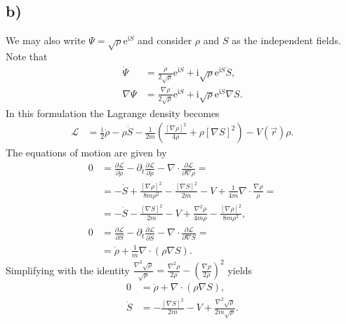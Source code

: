 \documentclass[english, parskip=full]{scrartcl}
\newcommand{\kla}{}
\renewcommand{\i}{\text{i}}
\newcommand{\e}{\text{e}}
\begin{document}
\subsection*{b)}
We may also write $\Psi = \sqrt{\rho}\e^{\i S}$ and consider $\rho$ and $S$ as the independent fields.
Note that
\begin{align}
\dot{\Psi} &= \frac{\dot{\rho}}{2\sqrt{\rho}} \e^{\i S} + \i\sqrt{\rho} \e^{\i S} \dot{S},\\
\nabla\Psi &= \frac{\nabla\rho}{2\sqrt{\rho}} \e^{\i S} + \i\sqrt{\rho}\e^{\i S}\nabla S.
\end{align}
In this formulation the Lagrange density becomes
\begin{align}
\mathcal{L} &= \frac{\i}{2}\dot{\rho} - \rho\dot{S} - \frac{1}{2m}\kla\left( {\frac{[\nabla\rho]^2}{4\rho} + \rho [\nabla S]^2 } \right) - V(\vec{r})\rho.
\end{align}
The equations of motion are given by
\begin{align}
0 &= \frac{\partial\mathcal{L}}{\partial\rho} - \partial_t \frac{\partial\mathcal{L}}{\partial \dot{\rho}} - \nabla \cdot \frac{\partial\mathcal{L}}{\partial \nabla\rho} = \\
&= -\dot{S} + \frac{[\nabla\rho]^2}{8m\rho^2} - \frac{[\nabla S]^2}{2m} - V + \frac{1}{4m}\nabla\cdot \frac{\nabla\rho}{\rho}  = \\
&= -\dot{S} - \frac{[\nabla S]^2}{2m} - V + \frac{\nabla^2\rho}{4m\rho} - \frac{[\nabla\rho]^2}{8m\rho^2},\\
0 &= \frac{\partial\mathcal{L}}{\partial S} - \partial_t \frac{\partial\mathcal{L}}{\partial \dot{S}} - \nabla \cdot \frac{\partial\mathcal{L}}{\partial \nabla S} = \\
&= \dot{\rho} + \frac{1}{m} \nabla\cdot \kla\left( {\rho\nabla S} \right).
\end{align}
Simplifying with the identity $\frac{\nabla^2\sqrt{\rho}}{\sqrt{\rho}} = \frac{\nabla^2\rho}{2\rho} - \kla\left( \frac{\nabla\rho}{2\rho} \right)^2$ yields
\begin{align}
0 &= \dot{\rho} + \nabla\cdot \kla\left( {\rho \nabla S} \right),\\
\dot{S} &= - \frac{[\nabla S]^2}{2m} - V + \frac{\nabla^2 \sqrt{\rho}}{2m \sqrt{\rho}} .
\end{align}
\end{document}
